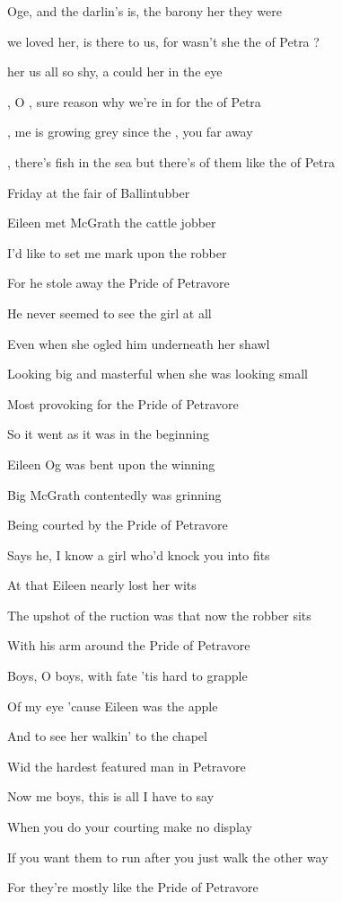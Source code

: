 \begin{SBVerse*}
 Oge, and  the darlin's  is,  the barony her  they were 

 we loved her,  is there to  us, for wasn't she the  of Petra ?

 her   us all so shy,  a  could  her in the eye

, O , sure  reason why we're in  for the  of Petra
\end{SBVerse*}
\bigskip
\begin{SBChorus}
 , me  is growing grey  since the , you  far away

 , there's  fish in the sea but there's  of them like the  of Petra
\end{SBChorus}
\bigskip
Friday at the fair of Ballintubber

Eileen met McGrath the cattle jobber

I'd like to set me mark upon the robber

For he stole away the Pride of Petravore

He never seemed to see the girl at all

Even when she ogled him underneath her shawl

Looking big and masterful when she was looking small

Most provoking for the Pride of Petravore

\bigskip

So it went as it was in the beginning

Eileen Og was bent upon the winning

Big McGrath contentedly was grinning

Being courted by the Pride of Petravore

Says he, \og I know a girl who'd knock you into fits \fg

At that Eileen nearly lost her wits

The upshot of the ruction was that now the robber sits

With his arm around the Pride of Petravore

\bigskip

Boys, O boys, with fate 'tis hard to grapple

Of my eye 'cause Eileen was the apple

And to see her walkin' to the chapel

Wid the hardest featured man in Petravore

Now me boys, this is all I have to say

When you do your courting make no display

If you want them to run after you just walk the other way

For they're mostly like the Pride of Petravore
